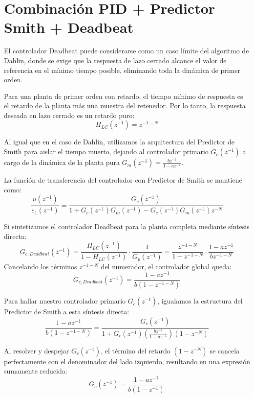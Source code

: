 \clearpage
\section{Combinación PID + Predictor Smith + Deadbeat}

El controlador Deadbeat puede considerarse como un caso límite del algoritmo de Dahlin, donde se exige que la respuesta de lazo cerrado alcance el valor de referencia en el mínimo tiempo posible, eliminando toda la dinámica de primer orden. 

Para una planta de primer orden con retardo, el tiempo mínimo de respuesta es el retardo de la planta más una muestra del retenedor. Por lo tanto, la respuesta deseada en lazo cerrado es un retardo puro:
\[
  H_{LC}(z^{-1}) = z^{-1-N}
\]

Al igual que en el caso de Dahlin, utilizamos la arquitectura del Predictor de Smith para aislar el tiempo muerto, dejando al controlador primario $G_c(z^{-1})$ a cargo de la dinámica de la planta pura $G_m(z^{-1}) = \frac{bz^{-1}}{1-az^{-1}}$.

La función de transferencia del controlador con Predictor de Smith se mantiene como:
\begin{equation}
  \frac{u(z^{-1})}{e_1(z^{-1})} = \frac{G_c(z^{-1})}{1 + G_c(z^{-1})G_m(z^{-1}) - G_c(z^{-1})G_m(z^{-1})z^{-N}}
\end{equation}

Si sintetizamos el controlador Deadbeat para la planta completa mediante síntesis directa:
\[
  G_{c,Deadbeat}(z^{-1}) = \frac{H_{LC}(z^{-1})}{1 - H_{LC}(z^{-1})}\cdot \frac{1}{G_p(z^{-1})} = \frac{z^{-1-N}}{1 - z^{-1-N}} \cdot \frac{1-az^{-1}}{bz^{-1-N}}
\]
Cancelando los términos $z^{-1-N}$ del numerador, el controlador global queda:
\[
  G_{c,Deadbeat}(z^{-1}) = \frac{1 - az^{-1}}{b(1 - z^{-1-N})}
\]

Para hallar nuestro controlador primario $G_c(z^{-1})$, igualamos la estructura del Predictor de Smith a esta síntesis directa:
\[
  \frac{1 - az^{-1}}{b(1 - z^{-1-N})} = \frac{G_c(z^{-1})}{1 + G_c(z^{-1}) \left( \frac{bz^{-1}}{1-az^{-1}} \right) (1 - z^{-N})} 
\]

Al resolver y despejar $G_c(z^{-1})$, el término del retardo $(1 - z^{-N})$ se cancela perfectamente con el denominador del lado izquierdo, resultando en una expresión sumamente reducida:
\begin{equation}
  G_c(z^{-1}) = \frac{1 - az^{-1}}{b(1 - z^{-1})} 
\end{equation}

